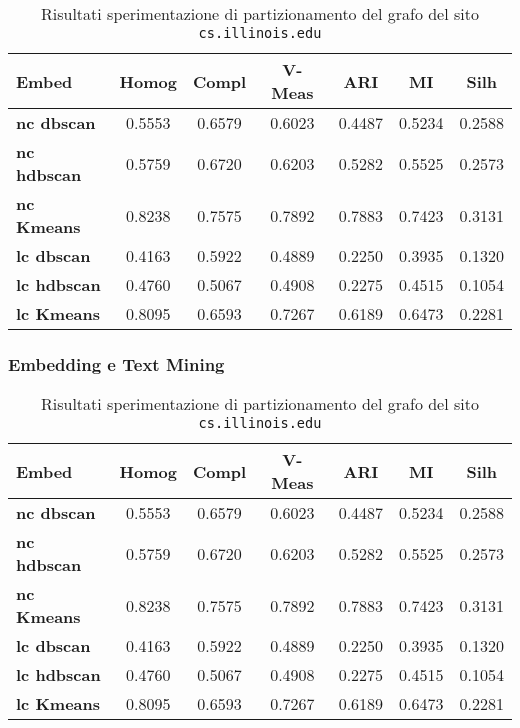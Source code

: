 \begin{table}[H]
	\begin{tabular}{| l | c | c | c | c | c | c |}
	\hline
	\textbf{Embed}  & \textbf{Homog} & \textbf{Compl} & \textbf{V-Meas}  & \textbf{ARI}  & \textbf{MI}  & \textbf{Silh} \\ [3ex] \hline
	\textbf{nc dbscan} & 0.5553 & 0.6579 & 0.6023 & 0.4487 & 0.5234 & 0.2588\\ [3ex]
	 \hline 
	\textbf{nc hdbscan} & 0.5759 & 0.6720 & 0.6203 & 0.5282 & 0.5525 & 0.2573\\ [3ex]
	 \hline
	\textbf{nc Kmeans} & 0.8238 & 0.7575 & 0.7892 & 0.7883 & 0.7423 & 0.3131\\ [3ex]
	 \hline	
	\textbf{lc dbscan} & 0.4163 & 0.5922 & 0.4889 & 0.2250 & 0.3935 & 0.1320\\ [3ex]
	\hline
	\textbf{lc hdbscan} & 0.4760 & 0.5067 & 0.4908 & 0.2275 & 0.4515 & 0.1054\\ [3ex]
	\hline
	
	\textbf{lc Kmeans} & 0.8095 & 0.6593 & 0.7267 & 0.6189 & 0.6473 & 0.2281\\ [3ex]
	\hline
	\end{tabular}
	\caption{Risultati sperimentazione di partizionamento del grafo del sito \texttt{cs.illinois.edu}}
	\label{metricheEmbed}
\end{table}

\subsubsection{Embedding e Text Mining}

\begin{table}[H]
	\begin{tabular}{| l | c | c | c | c | c | c |}
	\hline
	\textbf{Embed}  & \textbf{Homog} & \textbf{Compl} & \textbf{V-Meas}  & \textbf{ARI}  & \textbf{MI}  & \textbf{Silh} \\ [3ex] \hline
	\textbf{nc dbscan} & 0.5553 & 0.6579 & 0.6023 & 0.4487 & 0.5234 & 0.2588\\ [3ex]
	 \hline 
	\textbf{nc hdbscan} & 0.5759 & 0.6720 & 0.6203 & 0.5282 & 0.5525 & 0.2573\\ [3ex]
	 \hline
	\textbf{nc Kmeans} & 0.8238 & 0.7575 & 0.7892 & 0.7883 & 0.7423 & 0.3131\\ [3ex]
	 \hline	
	\textbf{lc dbscan} & 0.4163 & 0.5922 & 0.4889 & 0.2250 & 0.3935 & 0.1320\\ [3ex]
	\hline
	\textbf{lc hdbscan} & 0.4760 & 0.5067 & 0.4908 & 0.2275 & 0.4515 & 0.1054\\ [3ex]
	\hline
	
	\textbf{lc Kmeans} & 0.8095 & 0.6593 & 0.7267 & 0.6189 & 0.6473 & 0.2281\\ [3ex]
	\hline
	\end{tabular}
	\caption{Risultati sperimentazione di partizionamento del grafo del sito \texttt{cs.illinois.edu}}
	\label{metricheEmbed}
\end{table}


